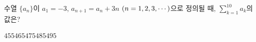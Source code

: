 \hspace*{2mm}\begin{minipage}[t]{\dimexpr\linewidth-2mm\relax}\vspace{0pt}
수열 $\{a_n\}$이 $a_1=-3$, $a_{n+1}=a_n+3n$ $(n=1{,}\mkern3mu\mathopen{}2{,}\mkern3mu\mathopen{}3{,}\mkern3mu\mathopen{}\cdots)$으로 정의될 때, $\displaystyle\sum_{k=1}^{10}a_k$의 값은?
\begin{choices32}{$455$}{$465$}{$475$}{$485$}{$495$}\end{choices32}\end{minipage}
